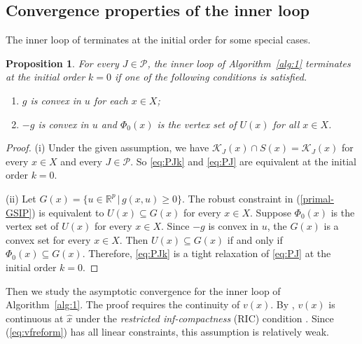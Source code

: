 \documentclass{amsart}
\newcommand{\reff}[1]{(\ref{#1})}
\theoremstyle{plain}
\newtheorem{prop}[theorem]{Proposition}
\newcommand{\re}{\mathbb{R}}
\newcommand{\mc}[1]{\mathcal{#1}}
\numberwithin{equation}{section}
\begin{document}
	
		
		
		
		\subsection{Convergence properties of the inner loop}\label{sc:solvePJ}
		The inner loop of  terminates at the initial order for some 
		special cases.
		\begin{prop}
			For every $J\in\mc{P}$, the inner loop of Algorithm~\ref{alg:1} 
			terminates at the initial order $k=0$ if one of the following conditions
			is satisfied.
			\begin{enumerate}
				\item[(i)] $g$ is convex in $u$ for each $x\in X$;
				\item[(ii)] $-g$ is convex in $u$ and $\Phi_0(x)$ is the vertex set of $U(x)$ for all $x\in X$.
			\end{enumerate}
		\end{prop}
		\begin{proof}
			(i) Under the given assumption, we have $\mc{K}_J(x)\cap S(x) = \mc{K}_J(x)$ 
			for every $x\in X$ and every $J\in\mc{P}$.
            So \eqref{eq:PJk} and \eqref{eq:PJ} are equivalent at the initial order $k=0$.
			
			(ii) Let $G(x)=\{u\in\re^p\,\vert\, g(x,u)\ge 0\}$. 
			The robust constraint in \reff{primal-GSIP} is equivalent to 
			$U(x)\subseteq G(x)$ for every $x\in X$.
			Suppose $\Phi_0(x)$ is the vertex set of $U(x)$ for every $x\in X$.
			Since $-g$ is convex in $u$, the $G(x)$ is a convex set for every $x\in X$.
			Then $U(x)\subseteq G(x)$ if and only if $\Phi_0(x)\subseteq G(x)$. 
			Therefore, \eqref{eq:PJk} is a tight relaxation of \eqref{eq:PJ} at the 
			initial order $k=0$.
		\end{proof}
		
		Then we study the asymptotic convergence for the inner loop of Algorithm~\ref{alg:1}.
		The proof requires the continuity of $v(x)$.
		By \cite[Lemma~4.5]{nie2023plmes}, $v(x)$ is continuous at $\hat{x}$ 
		under the {\it restricted inf-compactness} (RIC) condition \cite[Definition~3.13]{GuoRIC}.
		Since \reff{eq:vfreform} has all linear constraints, this assumption is relatively weak.
		
\end{document}
